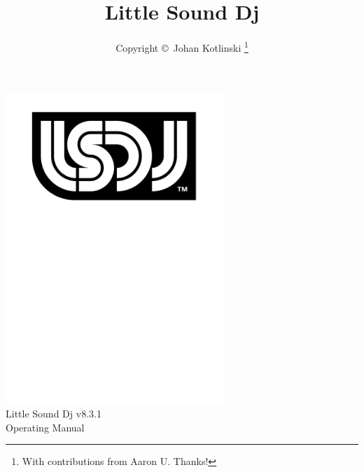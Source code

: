 \documentclass[b5paper,10.1pt,titlepage]{book}
\author{Copyright \copyright~Johan Kotlinski \thanks{With contributions from Aaron U. Thanks!}}
\title{Little Sound Dj \lsdjversion{}}
\newcommand{\lsdjversion}{v8.3.1}
\begin{document}
\begin{titlepage}
\begin{center}
\vspace*{2.31cm}
\includegraphics[width=8.29cm]{lsdj_black_rgb}\\
\vspace*{0.84cm}
\normalfont\sffamily
\LARGE
Little Sound Dj \lsdjversion{}
\\
\vspace*{0.55cm}
Operating Manual
\end{center}
\end{titlepage}

\maketitle
\tableofcontents








\appendix

\end{document}
